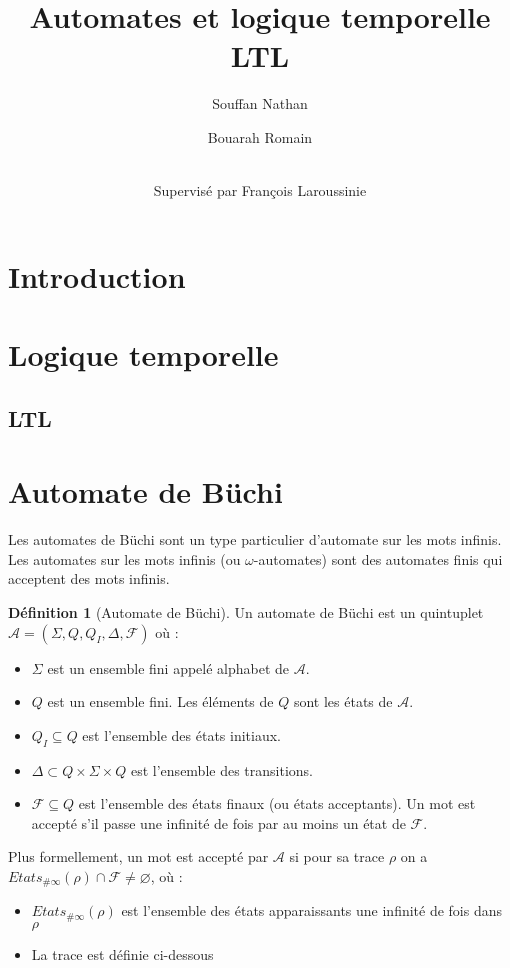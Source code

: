 \documentclass[12pt,a4paper]{article}
\title {Automates et logique temporelle LTL}
\author{
  Souffan Nathan \and
  Bouarah Romain \and
  \\Supervisé par François Laroussinie
}
\theoremstyle{plain}
\theoremstyle{definition}
\newtheorem{defi}{Définition}
\begin{document}
\maketitle
\tableofcontents

\section{Introduction}

\section{Logique temporelle}
\subsection{LTL}

\section{Automate de Büchi}
Les automates de Büchi sont un type particulier d'automate sur les mots infinis.
Les automates sur les mots infinis (ou $\omega$-automates) sont des automates finis qui acceptent des mots infinis.

\begin{defi}[Automate de Büchi]
  Un automate de Büchi est un quintuplet $\mathcal{A}=(\Sigma, Q, Q_I, \Delta, \mathcal{F})$ où :
  \begin{itemize}
  \item $\Sigma$ est un ensemble fini appelé alphabet de $\mathcal{A}$.
  \item $Q$ est un ensemble fini. Les éléments de $Q$ sont les états de $\mathcal{A}$.
  \item $Q_I \subseteq Q$ est l'ensemble des états initiaux.
  \item $\Delta \subset Q \times \Sigma \times Q$ est l'ensemble des transitions.
  \item $\mathcal{F} \subseteq Q$ est l'ensemble des états finaux (ou états acceptants).
    Un mot est accepté s'il passe une infinité de fois par au moins un état de $\mathcal{F}$.
  \end{itemize}

  Plus formellement, un mot est accepté par $\mathcal{A}$ si pour sa trace $\rho$ on a $Etats_{\#\infty}(\rho) \cap \mathcal{F} \neq \varnothing$, où :
  \begin{itemize}
  \item $Etats_{\#\infty}(\rho)$ est l'ensemble des états apparaissants une infinité de fois dans $\rho$
  \item La trace est définie ci-dessous
  \end{itemize}
\end{defi}
\end{document}

